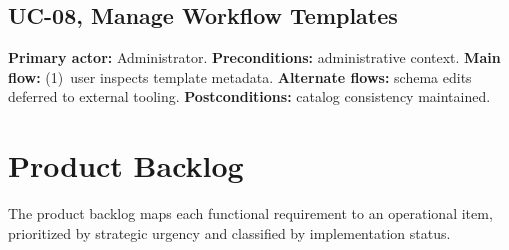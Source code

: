 \subsection{UC-08, Manage Workflow Templates}
\textbf{Primary actor:} Administrator. \textbf{Preconditions:} administrative context. \textbf{Main flow:} (1)~user inspects template metadata. \textbf{Alternate flows:} schema edits deferred to external tooling. \textbf{Postconditions:} catalog consistency maintained.

\section{Product Backlog}
\label{app:backlog}

The product backlog maps each functional requirement to an operational item, prioritized by strategic urgency and classified by implementation status.

